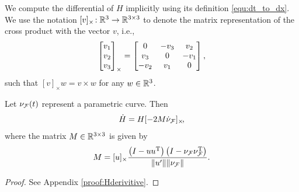\documentclass[journal]{IEEEtran}  %
\begin{document}
  We compute the differential of $H$ implicitly using its definition \eqref{equ:dt_to_dx}. We use the notation $[v]_{\times}\!:\mathbb{R}^{3}{}\to\mathbb{R}^{3\times 3}{}$ to denote the matrix representation of the cross product with the vector $v$, i.e.,
  \begin{equation}
    \begin{bmatrix}v_1\\v_2\\v_3\end{bmatrix}_\times= \begin{bmatrix}0 & -v_3 &v_2\\v_3 & 0 & -v_1\\-v_2 & v_1 & 0\end{bmatrix},
  \end{equation}
  such that $[v]_\times w=v\times w$ for any $w\in\mathbb{R}^{3}{}$. %
  \begin{proposition}\label{prop:Hderivitive}
    Let $\nu_{\mathcal{F}}(t)$ represent a parametric curve. Then
    \begin{equation}
      \dot{H}=H[-2M\dot{\nu}_{\mathcal{F}}]_{\times}\!,
    \end{equation}
    where the matrix $M\in\mathbb{R}^{3\times3}{}$ is given by
    \begin{equation}
      M=[u]_{\times}  \frac{ \left( I - u u^\mathrm{T} \right) \left( I- \nu_{\mathcal{F}} \nu_{\mathcal{F}}^\mathrm{T} \right)} {\lVert u'\rVert \lVert\nu_{\mathcal{F}}\rVert}.
    \end{equation}
  \end{proposition}
  \begin{proof}
  	See Appendix \ref{proof:Hderivitive}.
  \end{proof}
\end{document}
